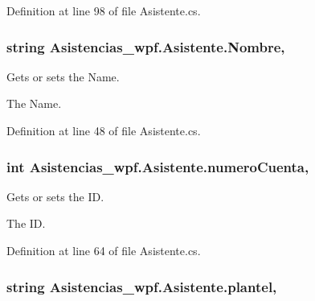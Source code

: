 Definition at line 98 of file Asistente.\-cs.

\hypertarget{class_asistencias__wpf_1_1_asistente_a321714ee92e497c61236fedca32912cb}{
\subsubsection[{Nombre}]{\setlength{\rightskip}{0pt plus 5cm}string Asistencias\-\_\-wpf.\-Asistente.\-Nombre\hspace{0.3cm}{\ttfamily [get]}, {\ttfamily [set]}}}\label{class_asistencias__wpf_1_1_asistente_a321714ee92e497c61236fedca32912cb}


Gets or sets the Name. 

The Name. 

Definition at line 48 of file Asistente.\-cs.

\hypertarget{class_asistencias__wpf_1_1_asistente_a6d2aa009497445d62699e3c9d402ca78}{
\subsubsection[{numero\-Cuenta}]{\setlength{\rightskip}{0pt plus 5cm}int Asistencias\-\_\-wpf.\-Asistente.\-numero\-Cuenta\hspace{0.3cm}{\ttfamily [get]}, {\ttfamily [set]}}}\label{class_asistencias__wpf_1_1_asistente_a6d2aa009497445d62699e3c9d402ca78}


Gets or sets the I\-D. 

The I\-D. 

Definition at line 64 of file Asistente.\-cs.

\hypertarget{class_asistencias__wpf_1_1_asistente_a4346dd7e16f0e8ef5de301d5e2b0439b}{
\subsubsection[{plantel}]{\setlength{\rightskip}{0pt plus 5cm}string Asistencias\-\_\-wpf.\-Asistente.\-plantel\hspace{0.3cm}{\ttfamily [get]}, {\ttfamily [set]}}}\label{class_asistencias__wpf_1_1_asistente_a4346dd7e16f0e8ef5de301d5e2b0439b}


